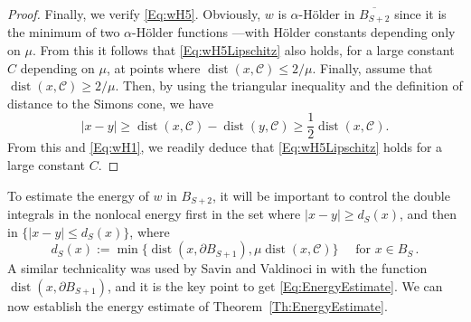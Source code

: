 \documentclass[12pt,reqno]{amsart}
\theoremstyle{definition}
\theoremstyle{remark}
\newcommand{\ccal}{\mathscr{C}}
\DeclareMathOperator{\dist}{dist}
\numberwithin{equation}{section}
\begin{document}
\begin{proof}
	Finally, we verify \eqref{Eq:wH5}. Obviously, $w$ is $\alpha$-Hölder in $\overline{B_{S+2}}$ since it is the minimum of two $\alpha$-Hölder functions ---with Hölder constants depending only on $\mu$. From this it follows that \eqref{Eq:wH5Lipschitz} also holds, for a large constant $C$ depending on $\mu$, at points where $\dist(x,\ccal)\leq 2/\mu$. Finally, assume that $\dist(x,\ccal)\geq 2/\mu$. Then, by using the triangular inequality and the definition of distance to the Simons cone, we have
	$$
	|x-y| \geq 	\dist(x,\ccal) - \dist(y,\ccal) \geq \dfrac{1}{2}\dist(x,\ccal).
	$$
	From this and \eqref{Eq:wH1}, we readily deduce that \eqref{Eq:wH5Lipschitz} holds for a large constant $C$.	
\end{proof}



To estimate the energy of $w$ in $B_{S+2}$, it will be important to control the double integrals in the nonlocal energy  first in the set where $|x-y|\geq d_S(x)$, and then in $\{|x-y|\leq d_S(x)\}$, where 
$$ 
d_S (x) 
:= \min \{\dist(x, \partial B_{S+1}),\mu \dist(x,\ccal)\} \quad \text{ for } x\in B_S\,.
$$
A similar technicality was used by Savin and Valdinoci in \cite{SavinValdinoci-EnergyEstimate} with the function $\dist(x, \partial B_{S+1})$, and it is the key point to get \eqref{Eq:EnergyEstimate}. We can now establish the energy estimate of Theorem~\ref{Th:EnergyEstimate}. 
\end{document}
